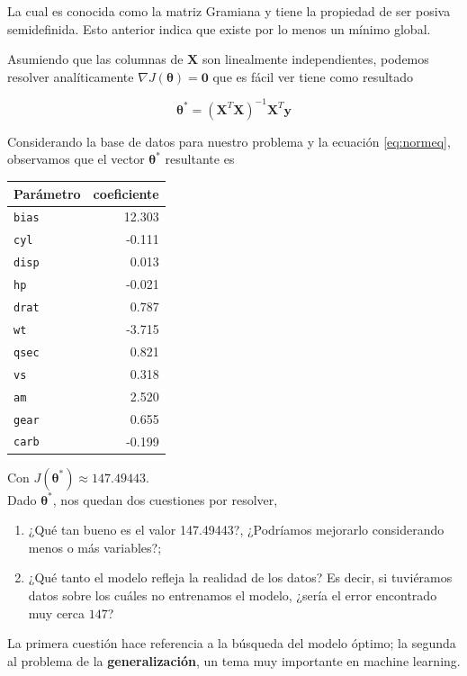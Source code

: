 \documentclass[11pt]{article}
\begin{document}
La cual es conocida como la matriz Gramiana y tiene la propiedad de ser posiva semidefinida. Esto anterior indica que existe por lo menos un mínimo global. 


Asumiendo que las columnas de $\bm X$ son linealmente independientes, podemos resolver analíticamente $\nabla J(\bm\theta) = \bm 0$ que es fácil ver tiene como resultado

\begin{equation}\label{eq:normeq}
  \bm\theta^* = \left(\bm X^T\bm X\right)^{-1} \bm{X}^T\bm y
\end{equation}

Considerando la base de datos para nuestro problema y la ecuación \ref{eq:normeq}, observamos que el vector $\bm\theta^*$ resultante es

\begin{center}
\begin{tabular}{lr}
Parámetro & coeficiente\\
\midrule
\texttt{bias} & 12.303\\
 \texttt{cyl} & -0.111 \\
\texttt{disp} & 0.013 \\ 
  \texttt{hp} & -0.021 \\
\texttt{drat} & 0.787 \\
  \texttt{wt} & -3.715\\
\texttt{qsec} & 0.821\\
  \texttt{vs} & 0.318\\
  \texttt{am} & 2.520\\
\texttt{gear} & 0.655\\
\texttt{carb} & -0.199\\
\end{tabular}
\end{center}

Con $J(\bm\theta^*) \approx 147.49443$.\\

Dado $\bm\theta^*$, nos quedan dos cuestiones por resolver,
\begin{enumerate}
	\item ¿Qué tan bueno es el valor 147.49443?, ¿Podríamos mejorarlo considerando menos o más variables?;
	\item ¿Qué tanto el modelo refleja la realidad de los datos? Es decir, si tuviéramos datos sobre los cuáles no entrenamos el modelo, ¿sería el error encontrado muy cerca $147$?
\end{enumerate}

La primera cuestión hace referencia a la búsqueda del modelo óptimo; la segunda al problema de la \textbf{generalización}, un tema muy importante en machine learning.
\end{document}
